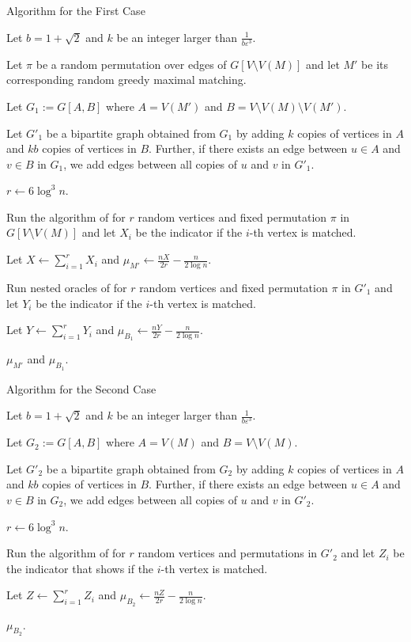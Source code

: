 \documentclass[letterpaper,11pt]{article}
\renewcommand{\epsilon}{\varepsilon}
\begin{document}
\begin{algorithm}[H]
\caption{Algorithm for the First Case}
\label{alg:first-case}
Let $b = 1 + \sqrt{2}$ and $k$ be an integer larger than $\frac{1}{b\epsilon^3}$.



Let $\pi$ be a random permutation over edges of $G[V \setminus V(M)]$ and let $M'$ be its corresponding random greedy maximal matching.


Let $G_1 := G[A,B]$ where $A = V(M')$ and $B = V \setminus V(M) \setminus V(M')$. 

Let $G'_1$ be a bipartite graph obtained from $G_1$ by adding $k$ copies of vertices in $A$ and $kb$ copies of vertices in $B$. Further, if there exists an edge between $u \in A$ and $v \in B$ in $G_1$, we add edges between all copies of $u$ and $v$ in $G'_1$.


$r \gets 6 \log^3 n$.

Run the algorithm of  for $r$ random vertices and fixed permutation $\pi$ in $G[V \setminus V(M)]$ and let $X_i$ be the indicator if the $i$-th vertex is matched.





Let $X \gets \sum_{i=1}^r X_i$ and $\mu_{M'} \gets \frac{nX}{2r} - \frac{n}{2\log n}$.




Run nested oracles of  for $r$ random vertices and fixed permutation $\pi$ in $G'_1$ and let $Y_i$ be the indicator if the $i$-th vertex is matched.


Let $Y \gets \sum_{i=1}^r Y_i$ and $\mu_{B_1} \gets \frac{nY}{2r} - \frac{n}{2\log n}$.


\Return $\mu_{M'}$ and $\mu_{B_1}$.



    
\end{algorithm}



\begin{algorithm}[H]
\caption{Algorithm for the Second Case}
\label{alg:second-case}
Let $b = 1 + \sqrt{2}$ and $k$ be an integer larger than $\frac{1}{b\epsilon^3}$.

Let $G_2 := G[A,B]$ where $A = V(M)$ and $B = V \setminus V(M)$.

Let $G'_2$ be a bipartite graph obtained from $G_2$ by adding $k$ copies of vertices in $A$ and $kb$ copies of vertices in $B$. Further, if there exists an edge between $u \in A$ and $v \in B$ in $G_2$, we add edges between all copies of $u$ and $v$ in $G'_2$.


$r \gets 6 \log^3 n$.


Run the algorithm of  for $r$ random vertices and permutations in $G'_2$ and let $Z_i$ be the indicator that shows if the $i$-th vertex is matched.


Let $Z \gets \sum_{i=1}^r Z_i$ and $\mu_{B_2} \gets \frac{nZ}{2r} - \frac{n}{2\log n}$.

\Return $\mu_{B_2}$.
    
\end{algorithm}
\end{document}
